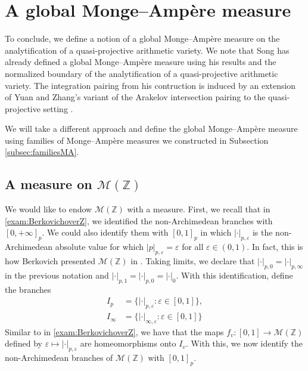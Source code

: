 \documentclass[11pt,reqno]{amsart}
\newcommand{\mZ}{\mathbb{Z}}
\newcommand{\sM}{{\mathscr M}}
\theoremstyle{theorem}
\numberwithin{equation}{subsection}
\numberwithin{equation}{subsection}
\theoremstyle{definition}
\theoremstyle{remark}
\numberwithin{equation}{subsubsection} \numberwithin{figure}{section}
\begin{document}
\section{A global Monge--Amp\`ere measure}
\label{sec:globalMA}
To conclude, we define a notion of a global Monge--Amp\`ere measure on the analytification of a quasi-projective arithmetic variety. 
We note that Song \cite[Section 6]{Song:EquivariantAdelic} has already defined a global Monge--Amp\`ere measure using his results and the normalized boundary of the analytification of a quasi-projective arithmetic variety. The integration pairing from his contruction is induced by an extension of Yuan and Zhang's variant of the Arakelov intersection pairing to the quasi-projective setting \cite[Section 4.1]{YuanZhang:AdelicLineBundles}. 

We will take a different approach and define the global Monge--Amp\`ere measure using families of Monge--Amp\`ere measures we constructed in Subsection \ref{subsec:familiesMA}. 

\subsection{A measure on $\sM(\mZ)$}
We would like to endow $\sM(\mZ)$ with a measure. 
First, we recall that in \autoref{exam:BerkovichoverZ}, we identified the non-Archimedean branches with $[0,+\infty]_p$. We could also identify them with $[0,1]_p$ in which $|\cdot|_{p,\varepsilon}$ is the non-Archimedean absolute value for which $|p|_{p,\varepsilon} = \varepsilon$ for all $\varepsilon\in (0,1)$. 
In fact, this is how Berkovich presented $\sM(\mZ)$ in \cite[Example 1.4.1]{BerkovichSpectral}. Taking limits, we declare that $|\cdot|_{p,0} = |\cdot|_{p,\infty}$ in the previous notation and $|\cdot|_{p,1} = |\cdot|_{p,0} = |\cdot|_0$. 
With this identification, define the branches
\begin{align*}
I_{p} &= \{ |\cdot|_{p,\varepsilon} : \varepsilon \in [0,1]\},\\
I_{\infty} &= \{ |\cdot|_{\infty,\varepsilon} : \varepsilon \in [0,1]\}
\end{align*}
Similar to in \autoref{exam:BerkovichoverZ}, we have that the maps $f_{v}\colon [0,1] \to\sM(\mZ)$ defined by $\varepsilon \mapsto |\cdot|_{p,\varepsilon}$ are homeomorphisms onto $I_v$. 
With this, we now identify the non-Archimedean branches of $\sM(\mZ)$ with $[0,1]_{p}$. 
\end{document}

